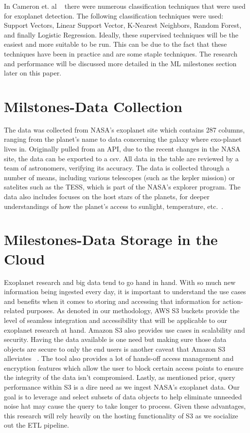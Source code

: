 \documentclass[letterpaper, 10 pt, conference]{ieeeconf}  %
\begin{document}
In Cameron et. al ~\cite{MLApproachesExoPlanets} there were numerous classification techniques that were used for exoplanet detection. The following classification techniques were used: Support Vectors, Linear Support Vector, K-Nearest Neighbors, Random Forest, and finally Logistic Regression. Ideally, these supervised techniques will be the easiest and more suitable to be run. This can be due to the fact that these techniques have been in practice and are some staple techniques. The research and performance will be discussed more detailed in the ML milestones section later on this paper.

\section{Milstones-Data Collection}

The data was collected from NASA's exoplanet site which contains 287 columns, ranging from the planet's name to data concerning the galaxy where exo-planet lives in. Originally pulled from an API, due to the recent changes in the NASA site, the data can be exported to a csv. All data in the table are reviewed by a team of astronomers, verifying its accuracy. The data is collected through a number of means, including various telescopes (such as the kepler mission) or satelites such as the TESS, which is part of the NASA's explorer program. The data also includes focuses on the host stars of the planets, for deeper understandings of how the planet's access to sunlight, temperature, etc.~\cite{nasaExoplanetArchive}. 

\section{Milestones-Data Storage in the Cloud}

Exoplanet research and big data tend to go hand in hand. With so much new information being ingested every day, it is important to understand the use cases and benefits when it comes to storing and accessing that information for action-related purposes. As denoted in our methodology, AWS S3 buckets provide the level of seamless integration and accessibility that will be applicable to our exoplanet research at hand. Amazon S3 also provides use cases in scalability and security. Having the data available is one need but making sure those data objects are secure to only the end users is another caveat that Amazon S3 alleviates ~\cite{AmazonS3}. The tool also provides a lot of hands-off access management and encryption features which allow the user to block certain access points to ensure the integrity of the data isn't compromised. Lastly, as mentioned prior, query performance within S3 is a dire need as we ingest NASA's exoplanet data. Our goal is to leverage and select subsets of data objects to help eliminate unneeded noise hat may cause the query to take longer to process. Given these advantages, this research will rely heavily on the hosting functionality of S3 as we socialize out the ETL pipeline.
\end{document}
